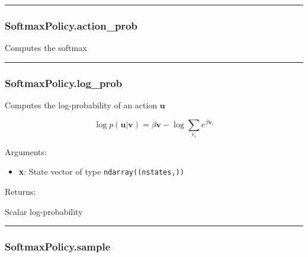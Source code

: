\begin{center}\rule{0.5\linewidth}{\linethickness}\end{center}

\subsubsection{SoftmaxPolicy.action\_prob}\label{softmaxpolicy.action_prob}

\begin{Shaded}
\begin{Highlighting}[]
\end{Highlighting}
\end{Shaded}

Computes the softmax

\begin{center}\rule{0.5\linewidth}{\linethickness}\end{center}

\subsubsection{SoftmaxPolicy.log\_prob}\label{softmaxpolicy.log_prob}

\begin{Shaded}
\begin{Highlighting}[]
\end{Highlighting}
\end{Shaded}

Computes the log-probability of an action \(\mathbf u\)

\[
\log p(\mathbf u|\mathbf v) = \beta \mathbf v - \log \sum_{v_i} e^{\beta \mathbf v_i}
\]

Arguments:

\begin{itemize}
\tightlist
\item
  \textbf{x}: State vector of type \texttt{ndarray((nstates,))}
\end{itemize}

Returns:

Scalar log-probability

\begin{center}\rule{0.5\linewidth}{\linethickness}\end{center}

\subsubsection{SoftmaxPolicy.sample}\label{softmaxpolicy.sample}

